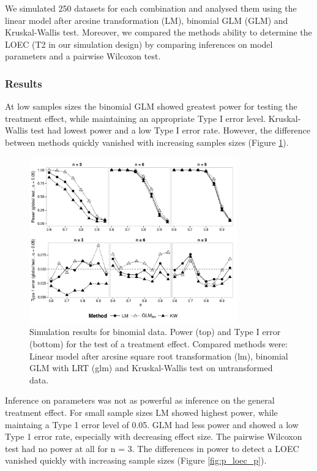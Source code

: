 \documentclass{scrartcl}
\begin{document}
We simulated 250 datasets for each combination and analysed them using the linear model after arcsine transformation (LM), binomial GLM (GLM) and Kruskal-Wallis test.
Moreover, we compared the methods ability to determine the LOEC (T2 in our simulation design) by comparing inferences on model parameters and a pairwise Wilcoxon test. 


\subsubsection{Results}
At low samples sizes the binomial GLM showed greatest power for testing the treatment effect, while maintaining an appropriate Type I error level.
Kruskal-Wallis test had lowest power and a low Type I error rate.
However, the difference between methods quickly vanished with increasing samples sizes (Figure \ref{fig:p_glob_p}).

\begin{figure}[h]
  \centering
  \includegraphics[width = 0.8\textwidth]{p_glob_p.pdf}
  \caption{Simulation results for binomial data. Power (top) and Type I error (bottom) for the test of a treatment effect. Compared methods were: Linear model after arcsine square root transformation (lm), binomial GLM with LRT (glm) and Kruskal-Wallis test on untransformed data.}
  \label{fig:p_glob_p}
\end{figure}

Inference on parameters was not as powerful as inference on the general treatment effect.
For small sample sizes LM showed highest power, while maintaing a Type 1 error level of 0.05.
GLM had less power and showed a low Type 1 error rate, especially with decreasing effect size.
The pairwise Wilcoxon test had no power at all for n = 3.
The differences in power to detect a LOEC vanished quickly with increasing sample sizes (Figure \ref{fig:p_loec_p}). 
\end{document}
